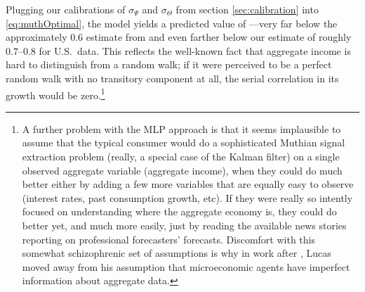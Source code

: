 \documentclass[titlepage]{\econtex}\newcommand{\texname}{cAndCwithStickyE}
\begin{document}
Plugging our calibrations of $\sigma_{\Psi}$ and $\sigma_{\Theta}$ from section \ref{sec:calibration} into \eqref{eq:muthOptimal}, the model yields a predicted value of ---very far below the approximately $0.6$ estimate from \cite{hrsHabit} and even farther below our estimate of roughly $0.7$--$0.8$ for U.S.\ data.  This reflects the well-known fact that aggregate income is hard to distinguish from a random walk; if it were perceived to be a perfect random walk with no transitory component at all, the serial correlation in its growth would be zero.\footnote{A further problem with the MLP approach is that it seems implausible to assume that the typical consumer would do a sophisticated Muthian signal extraction problem (really, a special case of the Kalman filter) on a single observed aggregate variable (aggregate income), when they could do much better either by adding a few more variables that are equally easy to observe (interest rates, past consumption growth, etc). If they were really so intently focused on understanding where the aggregate economy is, they could do better yet, and much more easily, just by reading the available news stories reporting on professional forecasters' forecasts.  Discomfort with this somewhat schizophrenic set of assumptions is why in work after \cite{lucas:imperfectInfo}, Lucas moved away from his assumption that microeconomic agents have imperfect information about aggregate data.}
\end{document}
